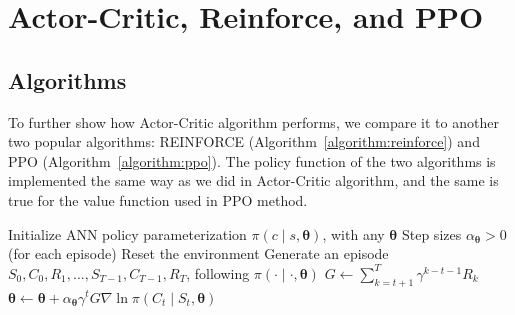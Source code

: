 \documentclass[balance,upint,subscriptcorrection,varvw,mathalfa=cal=boondoxo,pdf-a,nofoot]{asmeconf}
\begin{document}
\section{Actor-Critic, Reinforce, and PPO}
\subsection{Algorithms}
\noindent To further show how Actor-Critic algorithm performs, we compare it 
to another two popular algorithms: REINFORCE
(Algorithm~\ref{algorithm:reinforce}) and PPO (Algorithm~\ref{algorithm:ppo}).
The policy function of the two algorithms is implemented the same way as we 
did in Actor-Critic algorithm, and the same is true for the value function 
used in PPO method.
\begin{algorithm}
    \caption{Reinforce for financial problem~\cite{Sutton1998}}
    \label{algorithm:reinforce}
    \begin{algorithmic}[1]
        \State Initialize ANN policy parameterization
        \(\pi\left(c\middle|s, \bm{\theta}\right)\), with any \(\bm{\theta}\)
        \State Step sizes \(\alpha_{\bm{\theta}}>0\)
        \Loop \hspace{0.3mm} (for each episode)
        \State Reset the environment
        \State Generate an episode 
        \(S_0, C_0, R_1, ..., S_{T-1}, C_{T-1}, R_T\),
        following \(\pi\left(\cdot\middle|\cdot, \bm{\theta}\right)\)
        \State \(G \gets \sum_{k=t+1}^{T} \gamma^{k-t-1}R_k\)
        \State \(\bm{\theta} \gets \bm{\theta} + \alpha_{\bm{\theta}}\gamma^t
        G\nabla{\ln{\pi\left(C_t\middle|S_t, \bm{\theta}\right)}}\)
        \EndFor
        \EndLoop
    \end{algorithmic}
\end{algorithm}
\end{document}
